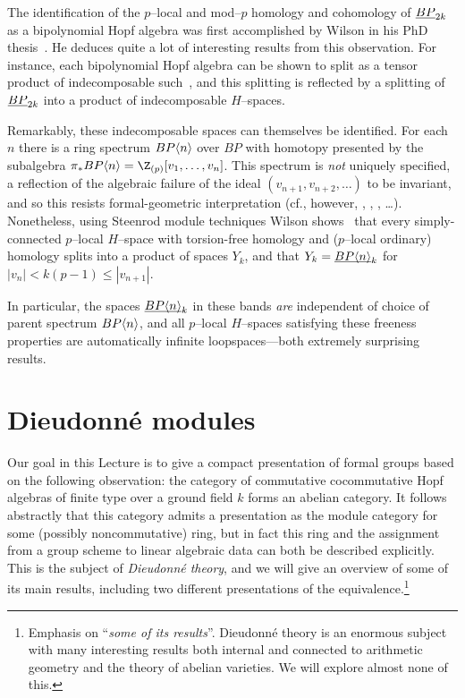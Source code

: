 \begin{remark}\label{WilsonSpaces}
The identification of the \(p\)--local and mod--\(p\) homology and cohomology of \(\underline{\smash{BP}}_{2k}\) as a bipolynomial Hopf algebra was first accomplished by Wilson in his PhD thesis~\cite[Theorem 3.3]{WilsonThesisI}.  He deduces quite a lot of interesting results from this observation.  For instance, each bipolynomial Hopf algebra can be shown to split as a tensor product of indecomposable such~\cite[Proposition 3.5]{WilsonThesisI}, and this splitting is reflected by a splitting of \(\underline{\smash{BP}}_{2k}\) into a product of indecomposable \(H\)--spaces.

Remarkably, these indecomposable spaces can themselves be identified.  For each \(n\) there is a ring spectrum \(BP\langle n\rangle\) over \(BP\) with homotopy presented by the subalgebra \(\pi_* BP\<n\> = \Z_{(p)}[v_1, \ldots, v_n]\).  This spectrum is \emph{not} uniquely specified, a reflection of the algebraic failure of the ideal \((v_{n+1}, v_{n+2}, \ldots)\) to be invariant, and so this resists formal-geometric interpretation (cf., however, \cite{AngeltveitLind}, \cite{LawsonNaumann}, \cite{StricklandProductsOnModules}, \ldots).  Nonetheless, using Steenrod module techniques Wilson shows~\cite[Section 6]{WilsonThesisII} that every simply-connected \(p\)--local \(H\)--space with torsion-free homology and (\(p\)--local ordinary) homology splits into a product of spaces \(Y_k\), and that \(Y_k = \underline{\smash{BP\langle n\rangle}}_{k}\) for \(|v_n| < k(p-1) \le |v_{n+1}|\).

In particular, the spaces \(\underline{\smash{BP\langle n\rangle}}_{k}\) in these bands \emph{are} independent of choice of parent spectrum \(BP\langle n\rangle\), and all \(p\)--local \(H\)--spaces satisfying these freeness properties are automatically infinite loopspaces---both extremely surprising results.
\end{remark}










\section{Dieudonn\'e modules}\label{SectionDieudonneModules}

Our goal in this Lecture is to give a compact presentation of formal groups based on the following observation: the category of commutative cocommutative Hopf algebras of finite type over a ground field \(k\) forms an abelian category.  It follows abstractly that this category admits a presentation as the module category for some (possibly noncommutative) ring, but in fact this ring and the assignment from a group scheme to linear algebraic data can both be described explicitly.  This is the subject of \textit{Dieudonn\'e theory}, and we will give an overview of some of its main results, including two different presentations of the equivalence.\footnote{Emphasis on ``\emph{some of its results}''.  Dieudonn\'e theory is an enormous subject with many interesting results both internal and connected to arithmetic geometry and the theory of abelian varieties.  We will explore almost none of this.}

